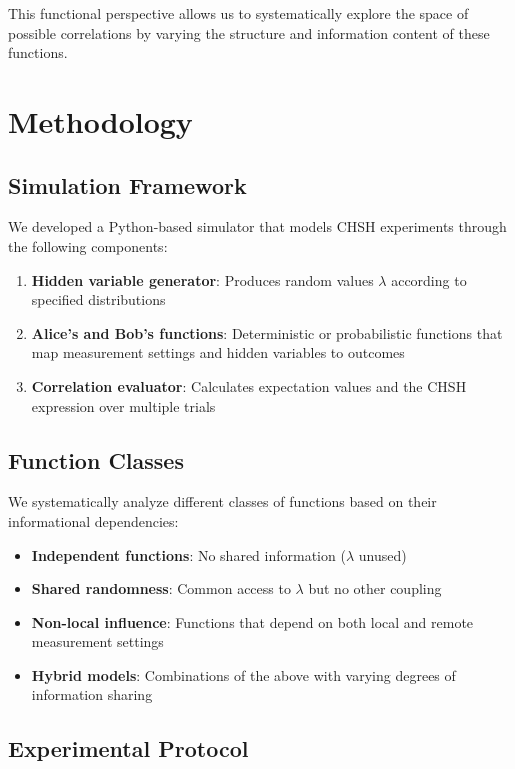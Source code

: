 \documentclass[11pt,a4paper]{article}
\begin{document}
This functional perspective allows us to systematically explore the space of possible correlations by varying the structure and information content of these functions.

\section{Methodology}

\subsection{Simulation Framework}

We developed a Python-based simulator that models CHSH experiments through the following components:

\begin{enumerate}
\item \textbf{Hidden variable generator}: Produces random values $\lambda$ according to specified distributions
\item \textbf{Alice's and Bob's functions}: Deterministic or probabilistic functions that map measurement settings and hidden variables to outcomes
\item \textbf{Correlation evaluator}: Calculates expectation values and the CHSH expression over multiple trials
\end{enumerate}

\subsection{Function Classes}

We systematically analyze different classes of functions based on their informational dependencies:

\begin{itemize}
\item \textbf{Independent functions}: No shared information ($\lambda$ unused)
\item \textbf{Shared randomness}: Common access to $\lambda$ but no other coupling
\item \textbf{Non-local influence}: Functions that depend on both local and remote measurement settings
\item \textbf{Hybrid models}: Combinations of the above with varying degrees of information sharing
\end{itemize}

\subsection{Experimental Protocol}
\end{document}
